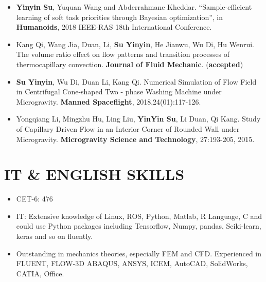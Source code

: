 \documentclass[11pt,a4paper,palatine]{moderncv}        %
\begin{document}
\begin{CJK*}{UTF8}{gbsn}
  {\begin{itemize}
    \item  \textbf{Yinyin Su}, Yuquan Wang and Abderrahmane Kheddar. “Sample-efficient learning of soft task priorities through Bayesian optimization”, in \textbf{Humanoids}, 2018 IEEE-RAS 18th International Conference.
    \item Kang Qi, Wang Jia, Duan, Li, \textbf{Su Yinyin}, He Jianwu, Wu Di, Hu Wenrui. The volume ratio effect on flow patterns and transition processes of thermocapillary convection. \textbf{Journal of Fluid Mechanic}. (\textbf{accepted})
    \item \textbf{Su Yinyin}, Wu Di, Duan Li, Kang Qi. Numerical Simulation of Flow Field in Centrifugal Cone-shaped Two - phase Washing Machine under Microgravity. \textbf{Manned Spaceflight}, 2018,24(01):117-126.   
    \item Yongqiang Li, Mingzhu Hu, Ling Liu, \textbf{YinYin Su}, Li Duan, Qi Kang. Study of Capillary Driven Flow in an Interior Corner of Rounded Wall under Microgravity. \textbf{Microgravity Science and Technology}, 27:193-205, 2015.
  \end{itemize}
}
\section{IT \& ENGLISH SKILLS}
    \begin{itemize}
        \item CET-6: 476
        \item IT: Extensive knowledge of Linux, ROS, Python, Matlab, R Language, C and could use Python packages including Tensorflow, Numpy, pandas, Sciki-learn, keras and so on fluently.
        \item Outstanding in mechanics theories, especially FEM and CFD. Experienced in FLUENT, FLOW-3D ABAQUS, ANSYS, ICEM, AutoCAD, SolidWorks, CATIA, Office.
    \end{itemize}


\end{CJK*}
\end{document}

